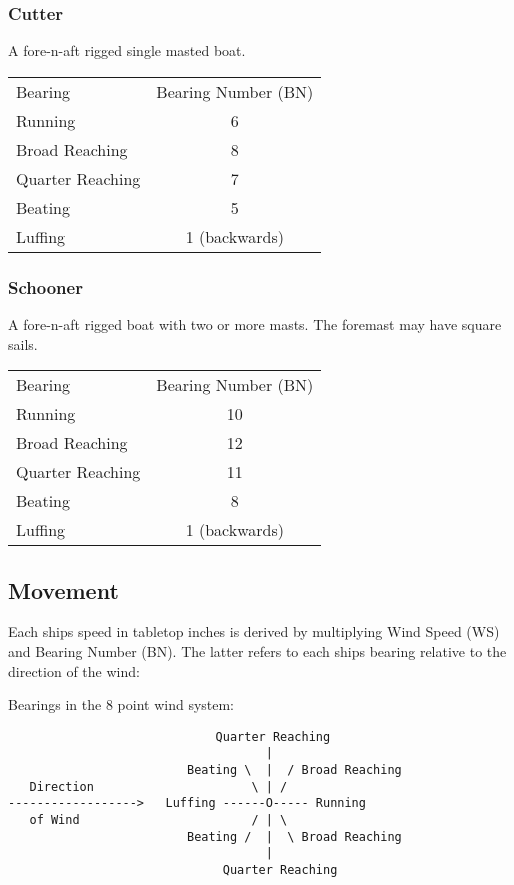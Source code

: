 \documentclass[11pt]{wbzine}
\begin{document}
\begin{multicols}{2}
\subsubsection{Cutter}

A fore-n-aft rigged single masted boat.

\begin{tabularx}{\columnwidth}{Zc}
Bearing & Bearing Number (BN) \\
Running & 6 \\
Broad Reaching & 8 \\
Quarter Reaching & 7 \\
Beating & 5 \\
Luffing & 1 (backwards) \\
\end{tabularx}

\subsubsection{Schooner}

A fore-n-aft rigged boat with two or more masts. The foremast may have
square sails.

\begin{tabularx}{\columnwidth}{Zc}
Bearing & Bearing Number (BN) \\
Running & 10 \\
Broad Reaching & 12 \\
Quarter Reaching & 11 \\
Beating & 8 \\
Luffing & 1 (backwards) \\
\end{tabularx}

\end{multicols}

\subsection{Movement}

Each ships speed in tabletop inches is derived by multiplying Wind Speed
(WS) and Bearing Number (BN). The latter refers to each ships bearing
relative to the direction of the wind:

Bearings in the 8 point wind system:

\begin{verbatim}
                             Quarter Reaching
                                    |
                         Beating \  |  / Broad Reaching
   Direction                      \ | /
------------------>   Luffing ------O----- Running
   of Wind                        / | \
                         Beating /  |  \ Broad Reaching
                                    |
                              Quarter Reaching
\end{verbatim}
\end{document}
